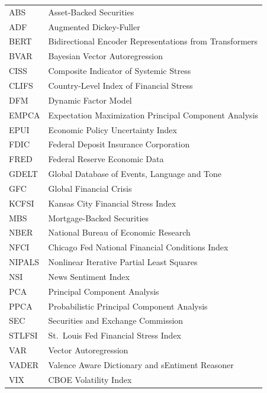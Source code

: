 \documentclass[12pt,a4paper]{report}
\begin{document}
{}
\listoftables
\clearpage

{}
\listoffigures
\clearpage

{}

\begin{tabular}{lp{11cm}}
  ABS     & Asset-Backed Securities \\
  ADF     & Augmented Dickey-Fuller \\
  BERT    & Bidirectional Encoder Representations from Transformers \\
  BVAR    & Bayesian Vector Autoregression \\
  CISS    & Composite Indicator of Systemic Stress \\
  CLIFS   & Country-Level Index of Financial Stress \\
  DFM     & Dynamic Factor Model \\
  EMPCA   & Expectation Maximization Principal Component Analysis \\
  EPUI    & Economic Policy Uncertainty Index \\
  FDIC    & Federal Deposit Insurance Corporation \\
  FRED    & Federal Reserve Economic Data \\
  GDELT   & Global Database of Events, Language and Tone \\
  GFC     & Global Financial Crisis \\
  KCFSI   & Kansas City Financial Stress Index \\
  MBS     & Mortgage-Backed Securities \\
  NBER    & National Bureau of Economic Research \\
  NFCI    & Chicago Fed National Financial Conditions Index \\
  NIPALS  & Nonlinear Iterative Partial Least Squares \\
  NSI     & News Sentiment Index \\
  PCA     & Principal Component Analysis \\
  PPCA    & Probabilistic Principal Component Analysis \\
  SEC     & Securities and Exchange Commission \\
  STLFSI  & St.\ Louis Fed Financial Stress Index \\
  VAR     & Vector Autoregression \\
  VADER   & Valence Aware Dictionary and sEntiment Reasoner \\
  VIX     & CBOE Volatility Index \\
\end{tabular}
\end{document}
